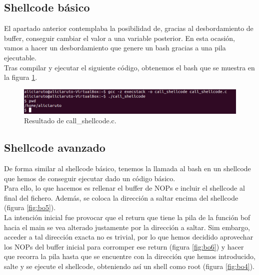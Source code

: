 \documentclass[a4,12pt,onecolum]{article}
\begin{document}
\subsection{Shellcode básico}

El apartado anterior contemplaba la posibilidad de, gracias al desbordamiento de buffer, conseguir cambiar el valor a una variable posterior. En esta ocasión, vamos a hacer un desbordamiento que genere un bash gracias a una pila ejecutable. \\

Tras compilar y ejecutar el siguiente código, obtenemos el bash que se muestra en la figura \ref{fig:bo3}.\\



\begin{figure}[htbp]
\centering
\includegraphics[width=1.0\textwidth]{./images/BOshellcode.png}
\caption{Resultado de call\_shellcode.c.}
\label{fig:bo3}
\end{figure}

\subsection{Shellcode avanzado}

De forma similar al shellcode básico, tenemos la llamada al bash en un shellcode que hemos de conseguir ejecutar dado un código básico. \\

Para ello, lo que hacemos es rellenar el buffer de NOPs e incluir el shellcode al final del fichero. Además, se coloca la dirección a saltar encima del shellcode (figura \ref{fig:bo5}).\\

La intención inicial fue provocar que el return que tiene la pila de la función bof hacia el main se vea alterado justamente por la dirección a saltar. Sim embargo, acceder a tal dirección exacta no es trivial, por lo que hemos decidido aprovechar los NOPs del buffer inicial para corromper ese return (figura \ref{fig:bo6}) y hacer que recorra la pila hasta que se encuentre con la dirección que hemos introducido, salte y se ejecute el shellcode, obteniendo así un shell como root (figura \ref{fig:bo4}).
\end{document}
